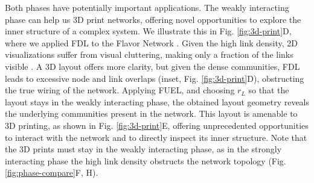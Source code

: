 \documentclass[endfloats,nofootinbib,preprint,floatfix,titlepage,superscriptaddress,linenumbers]{revtex4-1} %
\begin{document}
Both phases have potentially important applications. 
The weakly interacting phase can help us 3D print networks, offering novel opportunities to explore the inner structure of a complex system. 
We illustrate this in Fig. \ref{fig:3d-print}D, where we applied FDL to the Flavor Network \cite{ahn2011flavor}.
Given the high link density, 2D visualizations suffer from visual cluttering, making only a fraction of the links visible \cite{ahn2011flavor}. 
A 3D layout offers more clarity, but %
given the dense communities, FDL leads to excessive node and link overlaps (inset, Fig. \ref{fig:3d-print}D), obstructing the true wiring of the network. 
Applying FUEL, and choosing $r_L$ so that the layout stays in the weakly interacting phase, the obtained layout geometry reveals the underlying  communities present in the network. 
This layout is amenable to 3D printing, as shown in Fig. \ref{fig:3d-print}E, offering unprecedented opportunities to interact with the network and to directly inspect its inner structure.
Note that the 3D prints must stay in the weakly interacting phase, as in the strongly interacting phase the high link density obstructs the network topology (Fig. \ref{fig:phase-compare}F, H).
\end{document}

